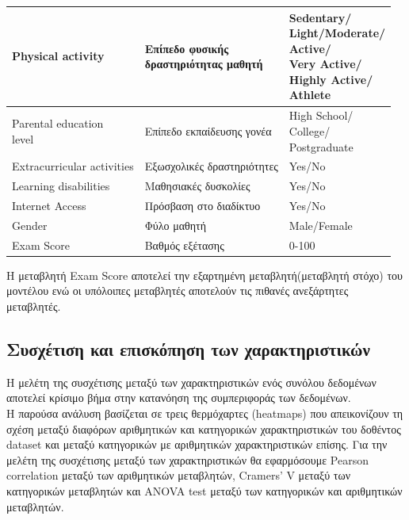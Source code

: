 \documentclass[12pt]{article}
\begin{document}
\begin{center}
\begin{longtable}{|p{5cm}|p{7.1cm}|p{4cm}|}
Physical activity & \makecell[l]{Επίπεδο φυσικής \\ δραστηριότητας μαθητή} & \makecell[l]{Sedentary/ \\ Light/Moderate/ \\ Active/ \\ Very Active/ \\ Highly Active/ \\ Athlete} \\ %
\hline

\makecell[l]{Parental education \\level} & Επίπεδο εκπαίδευσης γονέα & \makecell[l]{High School/ \\ College/ \\ Postgraduate} \\ %
\hline
Extracurricular activities & Εξωσχολικές δραστηριότητες & Yes/No \\ %
\hline
Learning disabilities & Μαθησιακές δυσκολίες & Yes/No \\ %
\hline

Internet Access & Πρόσβαση στο διαδίκτυο & Yes/No \\ %
\hline
Gender & Φύλο μαθητή & Male/Female \\ %
\hline

Exam Score & Βαθμός εξέτασης & 0-100 \\ %
\hline
\end{longtable}
\end{center}

\noindent Η μεταβλητή Exam Score αποτελεί την εξαρτημένη μεταβλητή(μεταβλητή στόχο) του μοντέλου ενώ οι υπόλοιπες μεταβλητές αποτελούν τις πιθανές ανεξάρτητες μεταβλητές. 

\subsection{Συσχέτιση και επισκόπηση των χαρακτηριστικών}

Η μελέτη της συσχέτισης μεταξύ των χαρακτηριστικών ενός συνόλου δεδομένων αποτελεί κρίσιμο βήμα στην κατανόηση της συμπεριφοράς των δεδομένων.\\

Η παρούσα ανάλυση βασίζεται σε τρεις θερμόχαρτες (heatmaps) που απεικονίζουν τη σχέση μεταξύ διαφόρων αριθμητικών και κατηγορικών χαρακτηριστικών του δοθέντος dataset και μεταξύ κατηγορικών με αριθμητικών χαρακτηριστικών επίσης. Για την μελέτη της συσχέτισης μεταξύ των χαρακτηριστικών θα εφαρμόσουμε Pearson correlation μεταξύ των αριθμητικών μεταβλητών, Cramers' V μεταξύ των κατηγορικών μεταβλητών και ANOVA test μεταξύ των κατηγορικών και αριθμητικών μεταβλητών. \\
\end{document}
